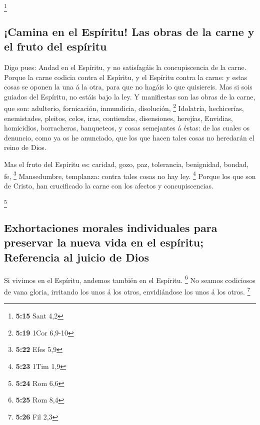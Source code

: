 \footnote{\textbf{5:15} Sant 4,2}

\hypertarget{camina-en-el-espuxedritu-las-obras-de-la-carne-y-el-fruto-del-espuxedritu}{%
\subsection{¡Camina en el Espíritu! Las obras de la carne y el fruto del
espíritu}\label{camina-en-el-espuxedritu-las-obras-de-la-carne-y-el-fruto-del-espuxedritu}}

 Digo pues: Andad en el Espíritu, y no satisfagáis la
concupiscencia de la carne.  Porque la carne codicia
contra el Espíritu, y el Espíritu contra la carne: y estas cosas se
oponen la una á la otra, para que no hagáis lo que quisiereis.
 Mas si sois guiados del Espíritu, no estáis bajo la ley.
 Y manifiestas son las obras de la carne, que son:
adulterio, fornicación, inmundicia, disolución, \footnote{\textbf{5:19}
  1Cor 6,9-10}  Idolatría, hechicerías, enemistades,
pleitos, celos, iras, contiendas, disensiones, herejías, 
Envidias, homicidios, borracheras, banqueteos, y cosas semejantes á
éstas: de las cuales os denuncio, como ya os he anunciado, que los que
hacen tales cosas no heredarán el reino de Dios.

 Mas el fruto del Espíritu es: caridad, gozo, paz,
tolerancia, benignidad, bondad, fe, \footnote{\textbf{5:22} Efes 5,9}
 Mansedumbre, templanza: contra tales cosas no hay ley.
\footnote{\textbf{5:23} 1Tim 1,9}  Porque los que son de
Cristo, han crucificado la carne con los afectos y concupiscencias.

\footnote{\textbf{5:24} Rom 6,6}

\hypertarget{exhortaciones-morales-individuales-para-preservar-la-nueva-vida-en-el-espuxedritu-referencia-al-juicio-de-dios}{%
\subsection{Exhortaciones morales individuales para preservar la nueva
vida en el espíritu; Referencia al juicio de
Dios}\label{exhortaciones-morales-individuales-para-preservar-la-nueva-vida-en-el-espuxedritu-referencia-al-juicio-de-dios}}

 Si vivimos en el Espíritu, andemos también en el
Espíritu. \footnote{\textbf{5:25} Rom 8,4}  No seamos
codiciosos de vana gloria, irritando los unos á los otros, envidiándose
los unos á los otros. \footnote{\textbf{5:26} Fil 2,3}

